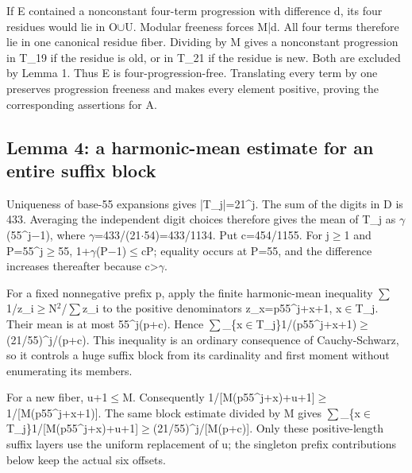 \documentclass[11pt,a4paper]{article}
\begin{document}
If E contained a nonconstant four-term progression with difference d, its four residues would lie in O\ensuremath{\cup}U. Modular freeness forces M|d. All four terms therefore lie in one canonical residue fiber. Dividing by M gives a nonconstant progression in T\_19 if the residue is old, or in T\_21 if the residue is new. Both are excluded by Lemma 1. Thus E is four-progression-free. Translating every term by one preserves progression freeness and makes every element positive, proving the corresponding assertions for A.

\subsection{Lemma 4: a harmonic-mean estimate for an entire suffix block}
Uniqueness of base-55 expansions gives |T\_j|=21\textasciicircum{}j. The sum of the digits in D is 433. Averaging the independent digit choices therefore gives the mean of T\_j as \ensuremath{\gamma}(55\textasciicircum{}j\ensuremath{-}1), where \ensuremath{\gamma}=433/(21\ensuremath{\cdot}54)=433/1134. Put c=454/1155. For j\ensuremath{\geq}1 and P=55\textasciicircum{}j\ensuremath{\geq}55, 1+\ensuremath{\gamma}(P\ensuremath{-}1)\ensuremath{\leq}cP; equality occurs at P=55, and the difference increases thereafter because c>\ensuremath{\gamma}.

For a fixed nonnegative prefix p, apply the finite harmonic-mean inequality \ensuremath{\sum}1/z\_i\ensuremath{\geq}N\ensuremath{^2}/\ensuremath{\sum}z\_i to the positive denominators z\_x=p55\textasciicircum{}j+x+1, x\ensuremath{\in}T\_j. Their mean is at most 55\textasciicircum{}j(p+c). Hence \ensuremath{\sum}\_\{x\ensuremath{\in}T\_j\}1/(p55\textasciicircum{}j+x+1)\ensuremath{\geq}(21/55)\textasciicircum{}j/(p+c). This inequality is an ordinary consequence of Cauchy-Schwarz, so it controls a huge suffix block from its cardinality and first moment without enumerating its members.

For a new fiber, u+1\ensuremath{\leq}M. Consequently 1/[M(p55\textasciicircum{}j+x)+u+1]\ensuremath{\geq}1/[M(p55\textasciicircum{}j+x+1)]. The same block estimate divided by M gives \ensuremath{\sum}\_\{x\ensuremath{\in}T\_j\}1/[M(p55\textasciicircum{}j+x)+u+1]\ensuremath{\geq}(21/55)\textasciicircum{}j/[M(p+c)]. Only these positive-length suffix layers use the uniform replacement of u; the singleton prefix contributions below keep the actual six offsets.
\end{document}
